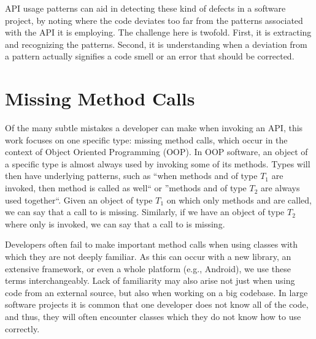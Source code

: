 API usage patterns \cite{robillard2013automated} can aid in detecting these kind of defects in a software project, by noting where the code deviates too far from the patterns associated with the API it is employing.
The challenge here is twofold.
First, it is extracting and recognizing the patterns.
Second, it is understanding when a deviation from a pattern actually signifies a code smell or an error that should be corrected.

\section{Missing Method Calls}

Of the many subtle mistakes a developer can make when invoking an API, this work focuses on one specific type: missing method calls, which occur in the context of Object Oriented Programming (OOP).
In OOP software, an object of a specific type is almost always used by invoking some of its methods.
Types will then have underlying patterns, such as ``when methods  and  of type $T_1$ are invoked, then method  is called as well`` or ''methods  and  of type $T_2$ are always used together``.
Given an object of type $T_1$ on which only methods  and  are called, we can say that a call to  is missing.
Similarly, if we have an object of type $T_2$ where only  is invoked, we can say that a call to  is missing.

Developers often fail to make important method calls when using classes with which they are not deeply familiar.
As this can occur with a new library, an extensive framework, or even a whole platform (e.g., Android), we use these terms interchangeably.
Lack of familiarity may also arise not just when using code from an external source, but also when working on a big codebase.
In large software projects it is common that one developer does not know all of the code, and thus, they will often encounter classes which they do not know how to use correctly.

